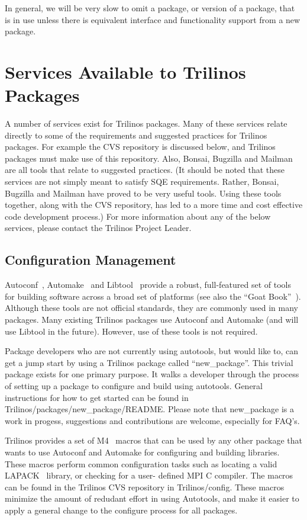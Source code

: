\documentclass[12pt,relax]{TrilinosDevGuide}
\begin{document}
In general, we will be very slow to omit a package, or version of a package, 
that is in use unless there is equivalent interface and functionality support 
from a new package.

\section{Services Available to Trilinos Packages}
\label{Section:AvailableServices}
A number of services exist for Trilinos packages.  Many of these 
services relate directly to some of the requirements and suggested practices 
for Trilinos packages.  For example the CVS repository is discussed below, and 
Trilinos packages must make use of this repository.  Also, Bonsai, Bugzilla 
and Mailman are all tools that relate to suggested practices.  (It should be 
noted that these services are not simply meant to satisfy SQE requirements.  
Rather, Bonsai, Bugzilla and Mailman have proved to be very useful tools.  
Using these tools together, along with the CVS repository, has led to a more 
time and cost effective code development process.)  For more information about 
any of the below services, please contact the Trilinos Project Leader.

\subsection{Configuration Management}
Autoconf~\cite{Autoconf},  Automake~\cite{Automake} and Libtool~\cite{Libtool} 
provide a robust, full-featured set of tools for building software across a 
broad set of platforms (see also the ``Goat Book''~\cite{GoatBook}).  Although 
these tools are not official standards, they are commonly used in many 
packages.  Many existing Trilinos packages use Autoconf and Automake (and will 
use Libtool in the future).  However, use of these tools is not required.

Package developers who are not currently using autotools, but would like
to, can get a jump start by using a Trilinos package called 
``new\_package''.  This trivial package exists for one primary purpose.  
It walks a developer through the process of setting up a package to 
configure and build using autotools.  General instructions for how to get 
started can be found in Trilinos/packages/new\_package/README.  Please note 
that new\_package is a work in progess, suggestions and contributions are 
welcome, especially for FAQ's.

Trilinos provides a set of M4~\cite{M4} macros that can be used by any other
package that wants to use Autoconf and Automake for configuring and
building libraries.  These macros perform common configuration tasks such as
locating a valid LAPACK~\cite{lapack} library, or checking for a user-
defined MPI C compiler.  The macros can be found in the Trilinos CVS 
repository in Trilinos/config.  These macros minimize the amount of redudant
 effort in using Autotools, and make it easier to apply a general change to 
the configure process for all packages.
\end{document}
